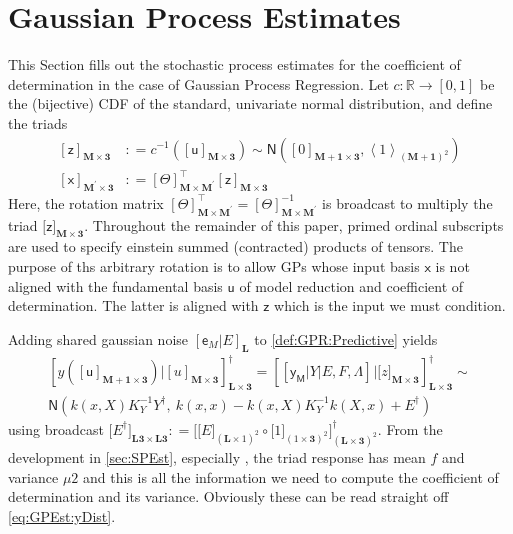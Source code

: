 \documentclass[preprint,12pt]{elsarticle}
\newcommand*{\M}[1]{\ensuremath{#1}\xspace}
\newcommand*{\x}{\times}
\newcommand*{\mi}[1]{\mathbf{#1}}
\newcommand*{\st}[1]{\mathbb{#1}}
\newcommand*{\rv}[1]{\mathsf{#1}}
\newcommand*{\te}[2][]{\left\lbrack{#2}\right\rbrack_{#1}}
\newcommand*{\tte}[2][]{\lbrack{#2}\rbrack_{#1}}
\newcommand*{\diag}[2][]{\left\langle{#2}\right\rangle_{#1}}
\newcommand*{\deq}{\M{\mathrel{\mathop:}=}}
\newcommand*{\gauss}[2]{\mathsf{N}\!\left({#1,#2}\right)}
\begin{document}
    \section{Gaussian Process Estimates}\label{sec:GPEst}
        This Section fills out the stochastic process estimates for the coefficient of determination in the case of Gaussian Process Regression. 
        Let $c\colon \st{R} \to [0,1]$ be the (bijective) CDF of the standard, univariate normal distribution, and define the triads
        \begin{equation*}
            \begin{aligned}
                \te[\mi{M\x 3}]{\rv{z}} &\deq c^{-1}\!\left(\te[\mi{M\x 3}]
                {\rv{u}}\right) \sim \gauss{\te[\mi{M+1\x 3}]{0}}{\diag[(\mi{M+1})^{2}]{1}} \\
                \te[\mi{M^{\prime}\x 3}]{\rv{x}} &\deq \te[\mi{M\x M^{\prime}}]{\Theta}^{\intercal} \te[\mi{M\x 3}]{\rv{z}}
            \end{aligned}
        \end{equation*}
        Here, the rotation matrix $\te[\mi{M\x M^{\prime}}]{\Theta}^{\intercal} = \te[\mi{M\x M^{\prime}}]{\Theta}^{-1}$ is broadcast to multiply the triad $\tte[\mi{M\x 3}]{\rv{z}}$. Throughout the remainder of this paper, primed ordinal subscripts are used to specify einstein summed (contracted) products of tensors.
        The purpose of ths arbitrary rotation is to allow GPs whose input basis $\rv{x}$ is not aligned with the fundamental basis $\rv{u}$ of model reduction and coefficient of determination. The latter is aligned with $\rv{z}$ which is the input we must condition.

        Adding shared gaussian noise $\te[\mi{L}]{\rv{e}_M\vert E}$ to \cref{def:GPR:Predictive} yields
        \begin{multline}\label{eq:GPEst:yDist}
            \te[\mi{L\x 3}]{y(\te[\mi{M+1\x 3}]{\rv{u}}) \big\vert \te[\mi{M\x 3}]{u}}^{\dagger} 
            = \te[\mi{L\x 3}]{\te{\rv{y_M} \vert Y \vert E,F,\Lambda} \big\vert \tte[\mi{M\x 3}]{z}}^{\dagger} \sim \\
            \gauss{k(x,X) K_{Y}^{-1} Y^{\dagger}}{\ k(x,x) - k(x,X) K_{Y}^{-1} k(X,x) + E^{\dagger}}
        \end{multline}
        using broadcast $\tte[\mi{L3\x L3}]{E^{\dagger}} \deq \tte[(\mi{L\x 3})^{2}]{\tte[(\mi{L}\x 1)^{2}]{E} \circ \tte[(1\x\mi{3})^{2}]{1}}^{\dagger}$. 
        From the development in \cref{sec:SPEst}, especially , the triad response has mean $f$ and variance $\mu{2}$ and this is all the information we need to compute the coefficient of determination and its variance. 
        Obviously these can be read straight off \cref{eq:GPEst:yDist}.
\end{document}
